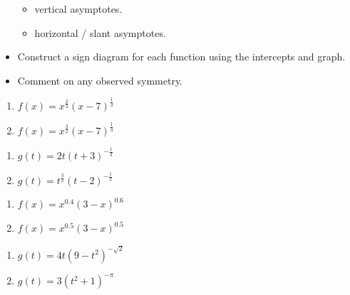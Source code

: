 \begin{itemize}
\begin{multicols}{2}
\begin{itemize}
\item  vertical asymptotes.

\item  horizontal / slant asymptotes.

\end{itemize}

\end{multicols}

\item Construct a sign diagram for each function using the intercepts and graph.

\item  Comment on any observed symmetry.


\end{itemize}


\begin{multicols}{2}
\begin{enumerate}
\setcounter{enumi}{\value{HW}}

\item $f(x) = x^{\frac{2}{3}}(x - 7)^{\frac{1}{3}}$  \label{powerfcngraphexfirst}
\item $f(x) = x^{\frac{3}{2}}(x - 7)^{\frac{1}{3}}$ 


\setcounter{HW}{\value{enumi}}
\end{enumerate}
\end{multicols}

\begin{multicols}{2}
\begin{enumerate}
\setcounter{enumi}{\value{HW}}

\item $g(t) = 2t(t+3)^{-\frac{1}{3}}$ 
\item $g(t) = t^{\frac{3}{2}}(t-2)^{-\frac{1}{2}}$ 


\setcounter{HW}{\value{enumi}}
\end{enumerate}
\end{multicols}

\begin{multicols}{2}
\begin{enumerate}
\setcounter{enumi}{\value{HW}}

\item $f(x) = x^{0.4} (3-x)^{0.6}$ 
\item $f(x) = x^{0.5} (3-x)^{0.5}$ 


\setcounter{HW}{\value{enumi}}
\end{enumerate}
\end{multicols}

\begin{multicols}{2}
\begin{enumerate}
\setcounter{enumi}{\value{HW}}

\item $g(t) = 4t (9-t^2)^{-\sqrt{2}}$ 
\item $g(t) = 3(t^2+1)^{-\pi}$  \label{powerfcngraphexlast}


\setcounter{HW}{\value{enumi}}
\end{enumerate}
\end{multicols}


